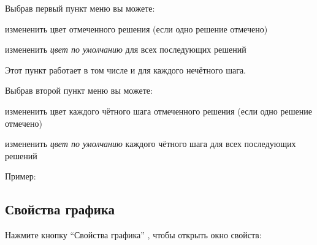 \documentclass[12pt]{article}
\begin{document}

Выбрав первый пункт меню вы можете:

\begin{compactitem}
\item измененить цвет отмеченного решения (если одно решение отмечено)
\item измененить \textit{цвет по умолчанию} для всех последующих решений
\end{compactitem}

Этот пункт работает в том числе и для каждого нечётного шага.

Выбрав второй пункт меню вы можете:

\begin{compactitem}
\item измененить цвет каждого чётного шага отмеченного решения (если одно решение отмечено)
\item измененить \textit{цвет по умолчанию} каждого чётного шага для всех последующих решений
\end{compactitem}

Пример:



\subsection{Свойства графика}

Нажмите кнопку ``Свойства графика'' , чтобы открыть окно свойств:

\end{document}
